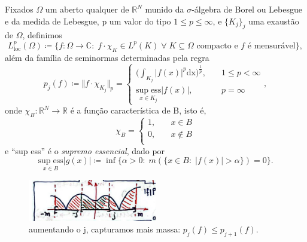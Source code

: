 \documentclass[../distribution_theory_notes.tex]{subfiles}
\begin{document}
\begin{example}
  Fixados \(\Omega \) um aberto qualquer de \(\mathbb{R}^{N}\) munido da \(\sigma\)-álgebra de Borel ou Lebesgue e da medida de Lebesgue, p um valor do tipo \(1\leq p\leq \infty\), e \(\{K_{j}\}_{j}\) uma exaustão de \(\Omega \), definimos 
    \[
      L_{\mathrm{loc}}^{p}(\Omega )\coloneqq \{f:\Omega \rightarrow \mathbb{C}:\; f \cdot \chi_{K}\in L^{p}(K) \;\forall\; K\subseteq \Omega \text{ compacto e }f\text{ é mensurável}\},
    \]
    além da família de seminormas determinadas pela regra 
      \[
        p_{j}(f)\coloneqq \Vert f \cdot \chi_{K_{j}} \Vert_{p} = \left\{\begin{array}{ll}
            \biggl(\int_{K_{j}}^{}|f(x)|^{p} \mathrm{dx}\biggr)^{\frac{1}{p}},&\quad 1\leq p< \infty\\ 
            \mathrm{sup\;ess}\limits_{x\in K_{j}}|f(x)|,&\quad p=\infty
          \end{array}\right.,
      \]
      onde \(\chi_{B}:\mathbb{R}^{N}\rightarrow \mathbb{R}\) é a função característica de B, isto é, 
        \[
          \chi_{B} = \left\{\begin{array}{ll}
              1,&\quad x\in B\\
              0,&\quad x\not\in B\\
            \end{array}\right.
        \]
        e ``sup ess'' é o \textit{supremo essencial}, dado por 
          \[
            \mathrm{sup\; ess}\limits_{x\in B}|g(x)| \coloneqq \inf_{}\{\alpha >0:\; m(\{x\in B:\; |f(x)|>\alpha \})=0\}.
          \]
         \begin{figure}[H]
         \begin{center}
         \includegraphics[height=0.5\textheight, width=0.5\textwidth, keepaspectratio]{./Images/locp_seminorms_04.png}
         \end{center}
         \caption{aumentando o j, capturamos mais massa: \(p_{j}(f)\leq p_{j+1}(f)\).}
         \end{figure}


\end{example}
\end{document}
